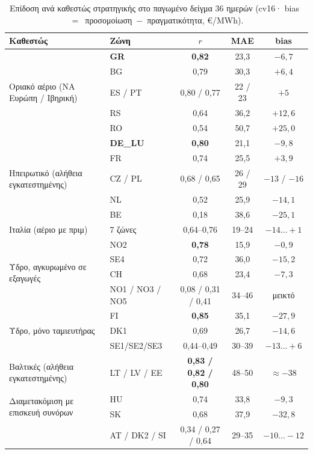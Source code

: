 \begin{table}[htbp]
\centering
\caption{Επίδοση ανά καθεστώς στρατηγικής στο παγωμένο δείγμα 36 ημερών (cv16· bias~$=$~προσομοίωση~$-$~πραγματικότητα, €/MWh).}
\label{tab:cv16-regimes}
\begin{tabular}{@{}llccc@{}}
\toprule
\textbf{Καθεστώς} & \textbf{Ζώνη} & \textbf{$r$} & \textbf{MAE} & \textbf{bias} \\
\midrule
\multirow{5}{*}{Οριακό αέριο (ΝΑ Ευρώπη / Ιβηρική)} & \textbf{GR} & \textbf{0,82} & 23,3 & $-6{,}7$ \\
 & BG & 0,79 & 30,3 & $+6{,}4$ \\
 & ES / PT & 0,80 / 0,77 & 22 / 23 & $+5$ \\
 & RS & 0,64 & 36,2 & $+12{,}6$ \\
 & RO & 0,54 & 50,7 & $+25{,}0$ \\
\midrule
\multirow{5}{*}{Ηπειρωτικό (αλήθεια εγκατεστημένης)} & \textbf{DE\_LU} & \textbf{0,80} & 21,1 & $-9{,}8$ \\
 & FR & 0,74 & 25,5 & $+3{,}9$ \\
 & CZ / PL & 0,68 / 0,65 & 26 / 29 & $-13$ / $-16$ \\
 & NL & 0,52 & 25,9 & $-14{,}1$ \\
 & BE & 0,18 & 38,6 & $-25{,}1$ \\
\midrule
Ιταλία (αέριο με πριμ) & 7 ζώνες & 0,64--0,76 & 19--24 & $-14 \ldots +1$ \\
\midrule
\multirow{4}{*}{Υδρο, αγκυρωμένο σε εξαγωγές} & NO2 & \textbf{0,78} & 15,9 & $-0{,}9$ \\
 & SE4 & 0,72 & 36,0 & $-15{,}2$ \\
 & CH & 0,68 & 23,4 & $-7{,}3$ \\
 & NO1 / NO3 / NO5 & 0,08 / 0,31 / 0,41 & 34--46 & μεικτό \\
\midrule
\multirow{3}{*}{Υδρο, μόνο ταμιευτήρας} & FI & \textbf{0,85} & 35,1 & $-27{,}9$ \\
 & DK1 & 0,69 & 26,7 & $-14{,}6$ \\
 & SE1/SE2/SE3 & 0,44--0,49 & 30--39 & $-13 \ldots +6$ \\
\midrule
Βαλτικές (αλήθεια εγκατεστημένης) & LT / LV / EE & \textbf{0,83 / 0,82 / 0,80} & 48--50 & $\approx -38$ \\
\midrule
\multirow{2}{*}{Διαμετακόμιση με επισκευή συνόρων} & HU & 0,74 & 33,8 & $-9{,}3$ \\
 & SK & 0,68 & 37,9 & $-32{,}8$ \\
 & AT / DK2 / SI & 0,34 / 0,27 / 0,64 & 29--35 & $-10 \ldots -12$ \\
\bottomrule
\end{tabular}
\end{table}


